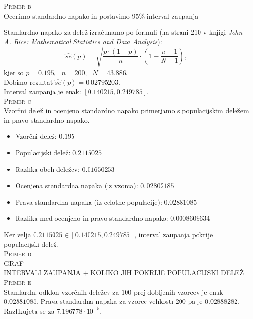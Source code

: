 \documentclass[a4paper,12pt]{article}
\begin{document}

\noindent
\textsc{Primer b}
\\
Ocenimo standardno napako in postavimo 95\% interval zaupanja.

\noindent
Standardno napako za delež izračunamo po formuli (na strani 210 v knjigi \textit{John A. Rice: Mathematical Statistics and Data Analysis}):
$$ \hat{se}(p) = \sqrt{ \frac{p \cdot (1-p)}{n} \cdot \left(1 - \frac{n - 1}{N - 1} \right)}, $$
kjer so $p = 0.195$, \ $n = 200$, \ $N = 43.886$. 
\\
Dobimo rezultat $\hat{se}(p) = 0.02795203$.
\\
Interval zaupanja je enak: $[0.140215, 0.249785]$.
\\


\noindent
\textsc{Primer c}
\\
Vzorčni delež in ocenjeno standardno napako primerjamo s populacijskim deležem in pravo standardno napako. 
\\
\begin{itemize}
\item Vzorčni delež: $0.195$ 
\item Populacijski delež: $0.2115025$ 
\item Razlika obeh deležev: $0.01650253$
\item Ocenjena standardna napaka (iz vzorca): $0,02802185$
\item Prava standardna napaka (iz celotne populacije):  $0.02881085$
\item Razlika med ocenjeno in pravo standardno napako: $0.0008609634$
\end{itemize}
Ker velja $0.2115025 \in [0.140215, 0.249785]$, interval zaupanja pokrije populacijski delež.
\\


\noindent
\textsc{Primer d}
\\
GRAF 
\\
INTERVALI ZAUPANJA + KOLIKO JIH POKRIJE POPULACIJSKI DELEŽ
\\


\noindent
\textsc{Primer e}
\\
Standardni odklon vzorčnih deležev za $100$ prej dobljenih vzorcev je enak $0.02881085$. Prava standardna napaka za vzorec velikosti $200$ pa je $0.02888282$.
Razlikujeta se za $7.196778 \cdot 10^{-5}$.
\\
\end{document}
